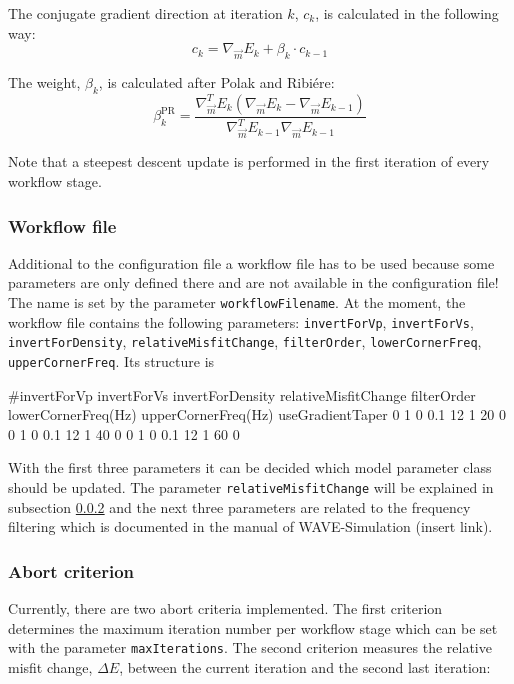 \documentclass[pdftex,a4paper,parskip,listof=totoc,bibliography=totoc,onehalfspacing,12pt]{scrreprt}
\begin{document}
The conjugate gradient direction at iteration $k$, $c_k$, is calculated in the following way:
\begin{equation*}
 c_k =  \nabla_{\vec{m}} E_k + \beta_k \cdot c_{k-1}
\end{equation*}

The weight, $\beta_k$, is calculated after Polak and Ribi\'{e}re:
\begin{equation*}
 \beta_k^{\mathrm{PR}} = \frac{ \nabla_{\vec{m}}^T E_k (\nabla_{\vec{m}} E_k - \nabla_{\vec{m}} E_{k-1}) }{\nabla_{\vec{m}}^T E_{k-1} \nabla_{\vec{m}} E_{k-1}}
\end{equation*}

Note that a steepest descent update is performed in the first iteration of every workflow stage.


\subsubsection{Workflow file}
Additional to the configuration file a workflow file has to be used because some parameters are only defined there and are not available in the configuration file! The name is set by the parameter \verb+workflowFilename+. At the moment, the workflow file contains the following parameters: \verb+invertForVp+, \verb+invertForVs+, \verb+invertForDensity+, \verb+relativeMisfitChange+, \verb+filterOrder+, \verb+lowerCornerFreq+, \verb+upperCornerFreq+. Its structure is 
\begin{verbnobox}[\fontsize{7pt}{7pt}\selectfont]
#invertForVp invertForVs invertForDensity relativeMisfitChange filterOrder lowerCornerFreq(Hz) upperCornerFreq(Hz) useGradientTaper
      0           1            0                 0.1                12             1                   20                0
      0           1            0                 0.1                12             1                   40                0
      0           1            0                 0.1                12             1                   60                0
\end{verbnobox}
With the first three parameters it can be decided which model parameter class should be updated. The parameter \verb+relativeMisfitChange+ will be explained in subsection \ref{config:abort} and the next three parameters are related to the frequency filtering which is documented in the manual of WAVE-Simulation (insert link). 


\subsubsection{Abort criterion}\label{config:abort}
Currently, there are two abort criteria implemented. The first criterion determines the maximum iteration number per workflow stage which can be set with the parameter \verb+maxIterations+. The second criterion measures the relative misfit change, $\Delta E$, between the current iteration and the second last iteration:
\end{document}
